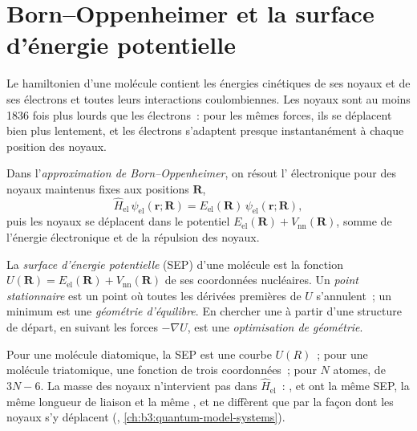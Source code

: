 \section{Born--Oppenheimer et la surface d'énergie potentielle}

Le hamiltonien d'une molécule contient les énergies cinétiques de ses
noyaux et de ses électrons et toutes leurs interactions coulombiennes.
Les noyaux sont au moins 1836 fois plus lourds que les électrons~: pour
les mêmes forces, ils se déplacent bien plus lentement, et les électrons
s'adaptent presque instantanément à chaque position des noyaux.

\begin{definition}\label{def:b3:computational-chemistry:born-oppenheimer}
Dans l'\emph{approximation de Born--Oppenheimer},
on résout l' électronique pour des noyaux
maintenus fixes aux positions $\mathbf R$,
\[
\hat H_{\mathrm{el}}\,\psi_{\mathrm{el}}(\mathbf r;\mathbf R) =
E_{\mathrm{el}}(\mathbf R)\,\psi_{\mathrm{el}}(\mathbf r;\mathbf R),
\]
puis les noyaux se déplacent dans le potentiel $E_{\mathrm{el}}(\mathbf R) +
V_{\mathrm{nn}}(\mathbf R)$, somme de l'énergie électronique et de la
répulsion des noyaux.
\end{definition}

\begin{definition}\label{def:b3:computational-chemistry:pes}
La \emph{surface d'énergie potentielle} (SEP) d'une
molécule est la fonction $U(\mathbf R) = E_{\mathrm{el}}(\mathbf R) +
V_{\mathrm{nn}}(\mathbf R)$ de ses coordonnées nucléaires. Un \emph{point
stationnaire} est un point où toutes les
dérivées premières de $U$ s'annulent~; un minimum est une
\emph{géométrie d'équilibre}.
En chercher une à partir d'une structure de départ, en suivant les
forces $-\nabla U$, est une \emph{optimisation de géométrie}.
\end{definition}

Pour une molécule diatomique, la SEP est une courbe $U(R)$~; pour une
molécule triatomique, une fonction de trois coordonnées~; pour $N$ atomes,
de $3N - 6$. La masse des noyaux n'intervient pas dans
$\hat H_{\mathrm{el}}$~: ,  et  ont la
même SEP, la même longueur de liaison et la même , et
ne diffèrent que par la façon dont les noyaux s'y déplacent (, \cref{ch:b3:quantum-model-systems}).

